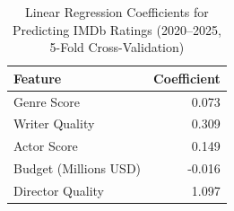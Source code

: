 \begin{table}
\caption{Linear Regression Coefficients for Predicting IMDb Ratings (2020--2025, 5-Fold Cross-Validation)}
\label{tab:linear_regression_coeffs}
\begin{tabular}{lr}
\toprule
Feature & Coefficient \\
\midrule
Genre Score & 0.073 \\
Writer Quality & 0.309 \\
Actor Score & 0.149 \\
Budget (Millions USD) & -0.016 \\
Director Quality & 1.097 \\
\bottomrule
\end{tabular}
\end{table}
